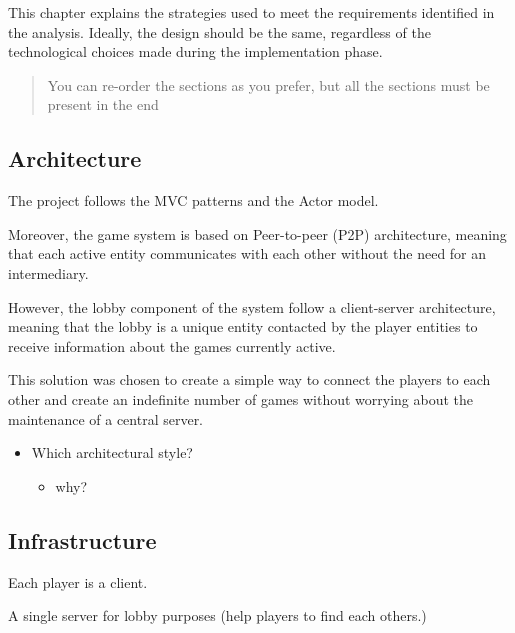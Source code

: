 \documentclass{scrartcl}
\begin{document}
This chapter explains the strategies used to meet the requirements
identified in the analysis. Ideally, the design should be the same,
regardless of the technological choices made during the implementation
phase.

\begin{quote}
You can re-order the sections as you prefer, but all the sections must
be present in the end
\end{quote}

\subsection{Architecture}\label{architecture}

The project follows the MVC patterns and the Actor model.

Moreover, the game system is based on Peer-to-peer (P2P) architecture, meaning that each active entity communicates with each other without the need for an intermediary.

However, the lobby component of the system follow a client-server architecture, meaning that the lobby is a unique entity contacted by the player entities to receive information about the games currently active.

This solution was chosen to create a simple way to connect the players to each other and create an indefinite number of games without worrying about the maintenance of a central server.


\begin{itemize}
  \item Which architectural style?

  \begin{itemize}
    \item why?
  \end{itemize}
\end{itemize}

\subsection{Infrastructure}\label{infrastructure}

Each player is a client.

A single server for lobby purposes (help players to find each others.)
\end{document}
